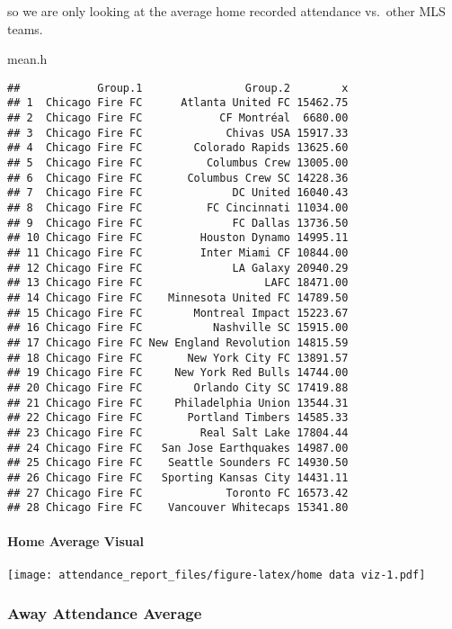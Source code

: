 \documentclass[
]{article}
\newenvironment{Shaded}{\begin{snugshade}}{\end{snugshade}}
\newcommand{\NormalTok}[1]{#1}
\begin{document}
so we are only looking at the average home recorded attendance vs.~other
MLS teams.

\begin{Shaded}
\begin{Highlighting}[]
\NormalTok{mean.h}
\end{Highlighting}
\end{Shaded}

\begin{verbatim}
##            Group.1                Group.2        x
## 1  Chicago Fire FC      Atlanta United FC 15462.75
## 2  Chicago Fire FC            CF Montréal  6680.00
## 3  Chicago Fire FC             Chivas USA 15917.33
## 4  Chicago Fire FC        Colorado Rapids 13625.60
## 5  Chicago Fire FC          Columbus Crew 13005.00
## 6  Chicago Fire FC       Columbus Crew SC 14228.36
## 7  Chicago Fire FC              DC United 16040.43
## 8  Chicago Fire FC          FC Cincinnati 11034.00
## 9  Chicago Fire FC              FC Dallas 13736.50
## 10 Chicago Fire FC         Houston Dynamo 14995.11
## 11 Chicago Fire FC         Inter Miami CF 10844.00
## 12 Chicago Fire FC              LA Galaxy 20940.29
## 13 Chicago Fire FC                   LAFC 18471.00
## 14 Chicago Fire FC    Minnesota United FC 14789.50
## 15 Chicago Fire FC        Montreal Impact 15223.67
## 16 Chicago Fire FC           Nashville SC 15915.00
## 17 Chicago Fire FC New England Revolution 14815.59
## 18 Chicago Fire FC       New York City FC 13891.57
## 19 Chicago Fire FC     New York Red Bulls 14744.00
## 20 Chicago Fire FC        Orlando City SC 17419.88
## 21 Chicago Fire FC     Philadelphia Union 13544.31
## 22 Chicago Fire FC       Portland Timbers 14585.33
## 23 Chicago Fire FC         Real Salt Lake 17804.44
## 24 Chicago Fire FC   San Jose Earthquakes 14987.00
## 25 Chicago Fire FC    Seattle Sounders FC 14930.50
## 26 Chicago Fire FC   Sporting Kansas City 14431.11
## 27 Chicago Fire FC             Toronto FC 16573.42
## 28 Chicago Fire FC    Vancouver Whitecaps 15341.80
\end{verbatim}

\hypertarget{home-average-visual}{%
\paragraph{Home Average Visual}\label{home-average-visual}}

\texttt{[image: attendance\_report\_files/figure-latex/home data viz-1.pdf]}

\hypertarget{away-attendance-average}{%
\subsubsection{Away Attendance Average}\label{away-attendance-average}}
\end{document}
